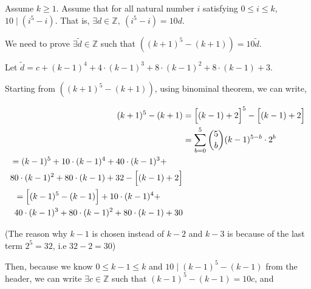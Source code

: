 \documentclass[12pt]{article}
\begin{document}
\begin{itemize}
\begin{itemize}
\begin{itemize}
\begin{mdframed}
\begin{enumerate}[1.]
                    \begin{mdframed}

                    Assume $k \geq 1$. Assume that for all natural number $i$ satisfying $0 \leq i \leq k$, $10 \mid (i^5 - i)$.
                    That is, $\exists d \in \mathbb{Z},\:(i^5 - i) = 10d$.

                    \bigskip

                    We need to prove $\exists \tilde{d} \in \mathbb{Z}$ such that
                    $((k+1)^5 - (k+1)) = 10 \tilde{d}$.

                    \bigskip

                    Let $\tilde{d} = c + (k-1)^4 + 4 \cdot (k-1)^3 + 8 \cdot (k-1)^2 +
                    8 \cdot(k-1) + 3$.

                    \bigskip

                    Starting from $((k+1)^5 - (k+1))$, using binominal theorem, we can write,

                    \begin{align}
                        (k+1)^5 - (k+1) &= \Bigl[ (k-1) + 2 \Bigr]^5 - \Bigl[ (k-1) + 2 \Bigr]\\
                        &= \sum\limits_{b=0}^5 \binom{5}{b} (k-1)^{5-b} \cdot 2^b\\
                        \begin{split}
                        &= (k-1)^5 + 10 \cdot (k-1)^4 + 40 \cdot (k-1)^3 + \\
                        & 80 \cdot (k-1)^2 + 80 \cdot(k-1) + 32 - \Bigl[ (k-1) + 2 \Bigr] \\
                        \end{split}\\
                        \begin{split}
                        &= \Bigl[ (k-1)^5 - (k-1) \Bigr] + 10 \cdot (k-1)^4 + \\
                        & 40 \cdot (k-1)^3 + 80 \cdot (k-1)^2 + 80 \cdot(k-1) + 30
                        \end{split}
                    \end{align}

                    (The reason why $k-1$ is chosen instead of $k-2$ and $k-3$ is
                    because of the last term $2^5 = 32$, i.e $32 -2 = 30$)

                    \bigskip

                    Then, because we know $0 \leq k - 1 \leq k$ and $10 \mid (k-1)^5 - (k-1)$
                    from the header, we can write $\exists c \in \mathbb{Z}$ such that
                    $(k-1)^5 - (k-1) = 10c$, and


\end{mdframed}
\end{enumerate}
\end{mdframed}
\end{itemize}
\end{itemize}
\end{itemize}
\end{document}
